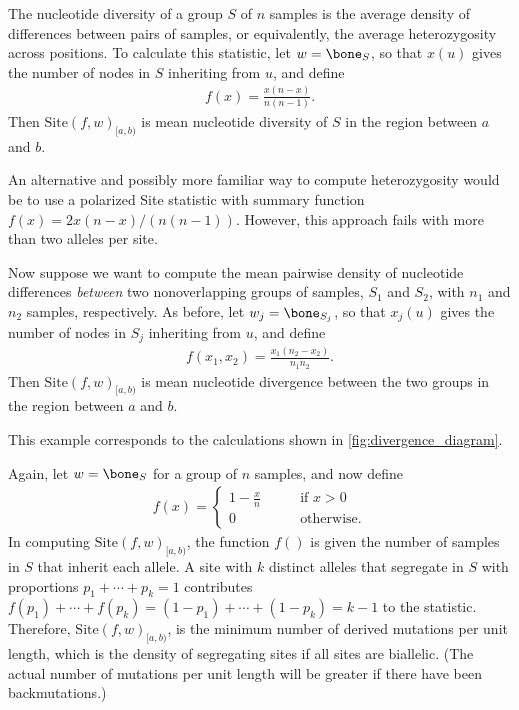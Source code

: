 \documentclass{article}
\newcommand{\site}{\mbox{Site}} %
\newcommand{\iw}{w} %
\newcommand{\nw}{x} %
\begin{document}
\begin{example} \label{ex:site_diversity}
    The nucleotide diversity of a group $S$ of $n$ samples
    is the average density of differences between pairs of samples,
    or equivalently, the average heterozygosity across positions.
    To calculate this statistic,
    let $\iw = \bone_S$,
    so that $\nw(u)$ gives the number of nodes in $S$ inheriting from $u$,
    and define
    \begin{align*}
        f(x) = \frac{x (n - x)}{n (n-1)} .
    \end{align*}
    Then $\site(f, \iw)_{[a,b)}$ is mean nucleotide diversity of $S$ in the region between $a$ and $b$.
\end{example}

An alternative and possibly more familiar way to compute heterozygosity
would be to use a polarized Site statistic with summary function $f(x) = 2
x(n-x)/\left(n(n-1)\right)$.
However, this approach fails with more than two alleles per site.

\begin{example} \label{ex:site_divergence}
    Now suppose we want to compute the mean pairwise density of nucleotide differences
    \emph{between} two nonoverlapping groups of samples, $S_1$ and $S_2$,
    with $n_1$ and $n_2$ samples, respectively.
    As before,
    let $\iw_j = \bone_{S_j}$,
    so that $\nw_{j}(u)$ gives the number of nodes in $S_j$ inheriting from $u$,
    and define
    \begin{align*}
        f(x_1, x_2) = \frac{x_1 (n_2 - x_2)}{n_1 n_2} .
    \end{align*}
    Then $\site(f, \iw)_{[a,b)}$ is mean nucleotide divergence between the two groups
    in the region between $a$ and $b$.
\end{example}

This example corresponds to the calculations shown in \autoref{fig:divergence_diagram}.

\begin{example} \label{ex:segregating_sites}
    Again, let $\iw = \bone_{S}$ for a group of $n$ samples,
    and now define
    \begin{align*}
        f(x) = \begin{cases}
            1 - \frac{x}{n} \qquad &\text{if } x > 0 \\
            0 \qquad &\text{otherwise} .
        \end{cases}
    \end{align*}
    In computing $\site(f, \iw)_{[a,b)}$, the function $f()$ is given the number of samples in $S$
    that inherit each allele.
    A site with $k$ distinct alleles that segregate in $S$ with proportions $p_1 + \cdots + p_k = 1$
    contributes $f(p_1) + \cdots + f(p_k) = (1 - p_1) + \cdots + (1 - p_k) = k - 1$ to the statistic.
    Therefore, $\site(f, \iw)_{[a,b)}$, is the minimum number of derived mutations per unit length,
    which is the density of segregating sites if all sites are biallelic.
    (The actual number of mutations per unit length will be greater if there have been backmutations.)
\end{example}
\end{document}
